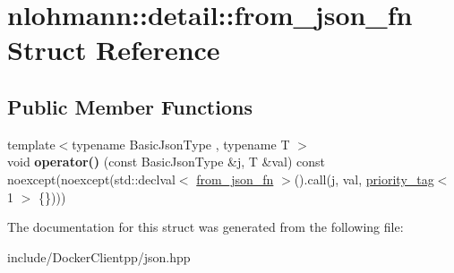 \hypertarget{structnlohmann_1_1detail_1_1from__json__fn}{}\section{nlohmann\+::detail\+::from\+\_\+json\+\_\+fn Struct Reference}
\label{structnlohmann_1_1detail_1_1from__json__fn}
\subsection*{Public Member Functions}
\begin{DoxyCompactItemize}
\item 
\mbox{\label{structnlohmann_1_1detail_1_1from__json__fn_a48e82ad9d244fdf249caa970a253e214}} 
{\footnotesize template$<$typename Basic\+Json\+Type , typename T $>$ }\\void {\bfseries operator()} (const Basic\+Json\+Type \&j, T \&val) const noexcept(noexcept(std\+::declval$<$ \mbox{\hyperlink{structnlohmann_1_1detail_1_1from__json__fn}{from\+\_\+json\+\_\+fn}} $>$().call(j, val, \mbox{\hyperlink{structnlohmann_1_1detail_1_1priority__tag}{priority\+\_\+tag}}$<$ 1 $>$ \{\})))
\end{DoxyCompactItemize}


The documentation for this struct was generated from the following file\+:\begin{DoxyCompactItemize}
\item 
include/\+Docker\+Clientpp/json.\+hpp\end{DoxyCompactItemize}
